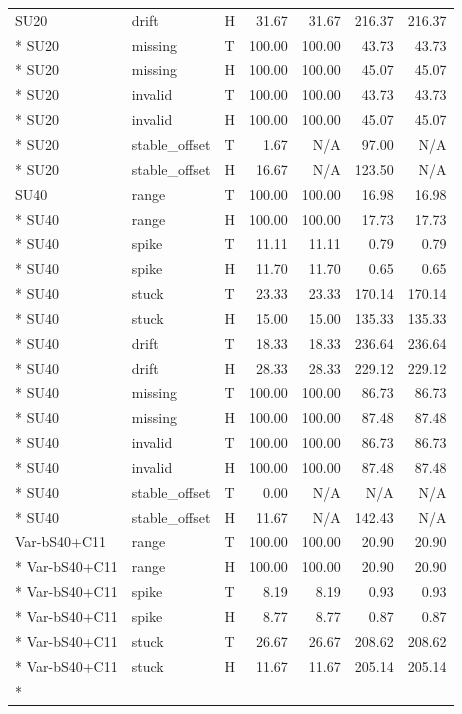 \begin{small}
\begin{longtable}{lllrrrr}
SU20 & drift & H & 31.67 & 31.67 & 216.37 & 216.37 \\*
SU20 & missing & T & 100.00 & 100.00 & 43.73 & 43.73 \\*
SU20 & missing & H & 100.00 & 100.00 & 45.07 & 45.07 \\*
SU20 & invalid & T & 100.00 & 100.00 & 43.73 & 43.73 \\*
SU20 & invalid & H & 100.00 & 100.00 & 45.07 & 45.07 \\*
SU20 & stable\_offset & T & 1.67 & N/A & 97.00 & N/A \\*
SU20 & stable\_offset & H & 16.67 & N/A & 123.50 & N/A \\
SU40 & range & T & 100.00 & 100.00 & 16.98 & 16.98 \\*
SU40 & range & H & 100.00 & 100.00 & 17.73 & 17.73 \\*
SU40 & spike & T & 11.11 & 11.11 & 0.79 & 0.79 \\*
SU40 & spike & H & 11.70 & 11.70 & 0.65 & 0.65 \\*
SU40 & stuck & T & 23.33 & 23.33 & 170.14 & 170.14 \\*
SU40 & stuck & H & 15.00 & 15.00 & 135.33 & 135.33 \\*
SU40 & drift & T & 18.33 & 18.33 & 236.64 & 236.64 \\*
SU40 & drift & H & 28.33 & 28.33 & 229.12 & 229.12 \\*
SU40 & missing & T & 100.00 & 100.00 & 86.73 & 86.73 \\*
SU40 & missing & H & 100.00 & 100.00 & 87.48 & 87.48 \\*
SU40 & invalid & T & 100.00 & 100.00 & 86.73 & 86.73 \\*
SU40 & invalid & H & 100.00 & 100.00 & 87.48 & 87.48 \\*
SU40 & stable\_offset & T & 0.00 & N/A & N/A & N/A \\*
SU40 & stable\_offset & H & 11.67 & N/A & 142.43 & N/A \\
Var-bS40+C11 & range & T & 100.00 & 100.00 & 20.90 & 20.90 \\*
Var-bS40+C11 & range & H & 100.00 & 100.00 & 20.90 & 20.90 \\*
Var-bS40+C11 & spike & T & 8.19 & 8.19 & 0.93 & 0.93 \\*
Var-bS40+C11 & spike & H & 8.77 & 8.77 & 0.87 & 0.87 \\*
Var-bS40+C11 & stuck & T & 26.67 & 26.67 & 208.62 & 208.62 \\*
Var-bS40+C11 & stuck & H & 11.67 & 11.67 & 205.14 & 205.14 \\*

\end{longtable}
\end{small}
